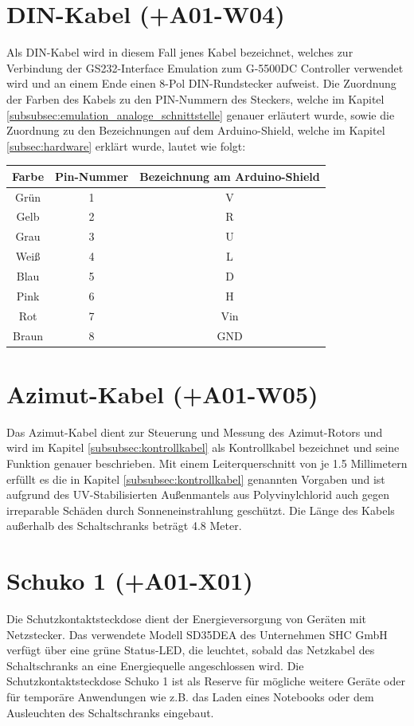 \section{DIN-Kabel (+A01-W04)}
Als DIN-Kabel wird in diesem Fall jenes Kabel bezeichnet, welches zur Verbindung der GS232-Interface Emulation zum G-5500DC Controller verwendet wird und an einem Ende einen 8-Pol DIN-Rundstecker aufweist. Die Zuordnung der Farben des Kabels zu den PIN-Nummern des Steckers, welche im Kapitel \ref{subsubsec:emulation_analoge_schnittstelle} genauer erläutert wurde, sowie die Zuordnung zu den Bezeichnungen auf dem Arduino-Shield, welche im Kapitel \ref{subsec:hardware} erklärt wurde, lautet wie folgt:

\begin{tabular}{c|c|c}
	\textbf{Farbe} & \textbf{Pin-Nummer} & \textbf{Bezeichnung am Arduino-Shield} \\
	\hline
	Grün & 1 & V \\
	Gelb & 2 & R \\
	Grau & 3 & U \\
	Weiß & 4 & L \\
	Blau & 5 & D \\
	Pink & 6 & H \\
	Rot & 7 & Vin \\
	Braun & 8 & GND \\
\end{tabular}

\section{Azimut-Kabel (+A01-W05)}
\label{sec:azimutkabel}
Das Azimut-Kabel dient zur Steuerung und Messung des Azimut-Rotors und wird im Kapitel \ref{subsubsec:kontrollkabel} als Kontrollkabel bezeichnet und seine Funktion genauer beschrieben. Mit einem Leiterquerschnitt von je 1.5 Millimetern erfüllt es die in Kapitel \ref{subsubsec:kontrollkabel} genannten Vorgaben und ist aufgrund des UV-Stabilisierten Außenmantels aus Polyvinylchlorid auch gegen irreparable Schäden durch Sonneneinstrahlung geschützt. Die Länge des Kabels außerhalb des Schaltschranks beträgt 4.8 Meter. 

\section{Schuko 1 (+A01-X01)}
\label{sec:schuko1}
Die Schutzkontaktsteckdose dient der Energieversorgung von Geräten mit Netzstecker. Das verwendete Modell SD35DEA des Unternehmen SHC GmbH verfügt über eine grüne Status-LED, die leuchtet, sobald das Netzkabel des Schaltschranks an eine Energiequelle angeschlossen wird. Die Schutzkontaktsteckdose Schuko 1 ist als Reserve für mögliche weitere Geräte oder für temporäre Anwendungen wie z.B. das Laden eines Notebooks oder dem Ausleuchten des Schaltschranks eingebaut.

